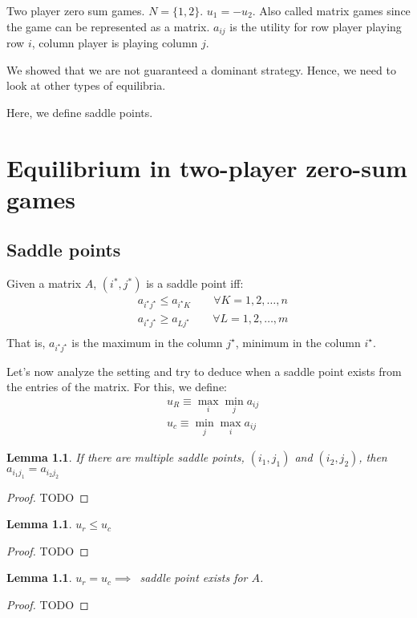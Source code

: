\documentclass[11pt]{book}
\newtheorem{lemma}[corollary]{Lemma}
\newtheorem{proof}[corollary]{Proof}
\begin{document}
Two player zero sum games. $N = \{1, 2\}$. $u_1 = - u_2$. Also called
matrix games since the game can be represented as a matrix. $a_{ij}$ is
the utility for row player playing row $i$, column player is playing
column $j$.

We showed that we are not guaranteed a dominant strategy. Hence, we need
to look at other types of equilibria.

Here, we define saddle points. 

\chapter{Equilibrium in two-player zero-sum games}
\section{Saddle points}
Given a matrix $A$, $(i^*, j^*)$ is a saddle point iff:
\begin{align*}
    &a_{i^\star j^\star } \leq a_{i^\star K} \qquad \forall K = 1, 2, \dots, n \\
    &a_{i^\star j^\star } \geq a_{L j^\star } \qquad \forall L = 1, 2, \dots, m \\
\end{align*}
That is, $a_{i^\star j^\star }$ is the maximum in the column $j^\star$, minimum in the column
$i^\star $.


Let's now analyze the setting and try to deduce when a saddle point
exists from the entries of the matrix. For this, we define:
\begin{align*}
&u_R \equiv \max_i \min_j a_{ij} \\
&u_c \equiv \min_j \max_i a_{ij}
\end{align*}

\begin{lemma}
    If there are multiple saddle points, $(i_1, j_1)$ and $(i_2, j_2)$, then
    $a_{i_1 j_1} = a_{i_2 j_2}$
\end{lemma}
\begin{proof} TODO \end{proof}

\begin{lemma}
    $u_r \leq u_c$
\end{lemma}
\begin{proof} TODO \end{proof}

\begin{lemma}
    $u_r = u_c \implies $~saddle point exists for $A$.
\end{lemma}
\begin{proof} 
TODO
\end{proof}
\end{document}
